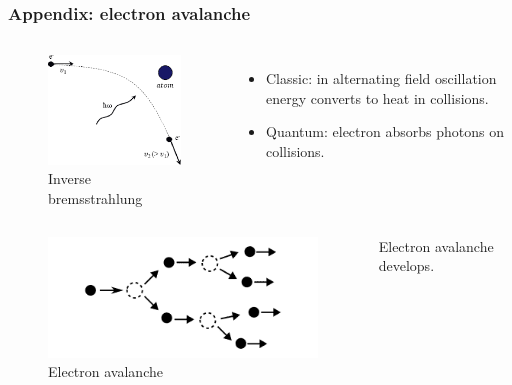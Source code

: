 \documentclass{beamer}
\begin{document}
	\begin{frame}
		\frametitle{Appendix: electron avalanche}
		
		\begin{columns}
			\begin{figure}
				\centering
				\includegraphics[width=0.7\linewidth]{res/inverse_bremsstrahlung.png}
				\caption*{Inverse bremsstrahlung}
			\end{figure}
			\begin{itemize}
				\item Classic: in alternating field oscillation energy converts to heat in collisions.
				\item Quantum: electron absorbs photons on collisions.
			\end{itemize}
		\end{columns}
		\begin{columns}
			\column{0.5\linewidth}
			\begin{figure}
				\centering
				\includegraphics[width=0.8\linewidth]{res/electron_avalanche.png}
				\caption*{Electron avalanche}
			\end{figure}
			
			\column{0.5\linewidth}
			Electron avalanche develops.
			
		\end{columns}		
		

\end{frame}
\end{document}
